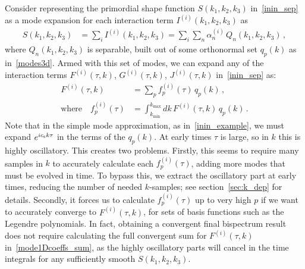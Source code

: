 \documentclass[a4paper,12pt]{extarticle}
\newcommand{\kmin}{{k_\text{min}}}
\newcommand{\kmax}{{k_\text{max}}}
\begin{document}
Consider representing the primordial shape function $S(k_1, k_2, k_3)$ in~\eqref{inin_sep} as
a mode expansion for each interaction term $I^{(i)}(k_1, k_2,k_3)$ as
\begin{align}\label{modeexp}
S(k_1, k_2,k_3) &= \sum_i I^{(i)}(k_1,k_2,k_3) =  \sum_i \sum_n \alpha_n^{(i)}  \, Q_n(k_1,k_2,k_3)\,,
\end{align}
where $Q_n(k_1,k_2,k_3)$ is separable, built out of some
orthonormal set $q_p(k)$ as in~\eqref{modes3d}.
Armed with this set of modes,
we can expand any of the interaction terms $F^{(i)}(\tau, k)$, $G^{(i)}(\tau, k)$, $J^{(i)}(\tau, k)$
in~\eqref{inin_sep} as:
\begin{align}
    F^{(i)}(\tau, k) &= \sum _p f_p^{(i)} (\tau) \, q_p(k)\,,\label{mode1Dcoeffs_sum}\\
    \text{where} \quad f_p^{(i)} (\tau)  &= \int _\kmin^\kmax dk \,F^{(i)}(\tau, k) \, q_p(k) \,.\label{mode1Dcoeffs_integral}
\end{align}
Note that in the simple mode approximation, as in~\eqref{inin_example},
we must expand $e^{ic_{\rm s} k\tau}$ in the terms of the $q_p(k)$.
At early times $\tau$ is large, so in $k$ this is highly oscillatory.
This creates two problems. Firstly, this seems to require many samples
in $k$ to accurately calculate each $f_p^{(i)} (\tau)$,
adding more modes that must be evolved in time.
To bypass this, we extract the oscillatory part at
early times, reducing the number of needed
$k$-samples; see section~\eqref{sec:k_dep} for details.
Secondly, it forces us to calculate $f_p^{(i)} (\tau)$
up to very high $p$ if we want to accurately converge to $F^{(i)}(\tau, k)$,
for sets of basis functions such as the Legendre polynomials.
In fact, obtaining a convergent final bispectrum result
does not require calculating the full convergent sum
for $F^{(i)}(\tau, k)$ in~\eqref{mode1Dcoeffs_sum},
as the highly oscillatory parts will cancel in the time integrals
for any sufficiently smooth $S(k_1,k_2,k_3)$.
\end{document}
